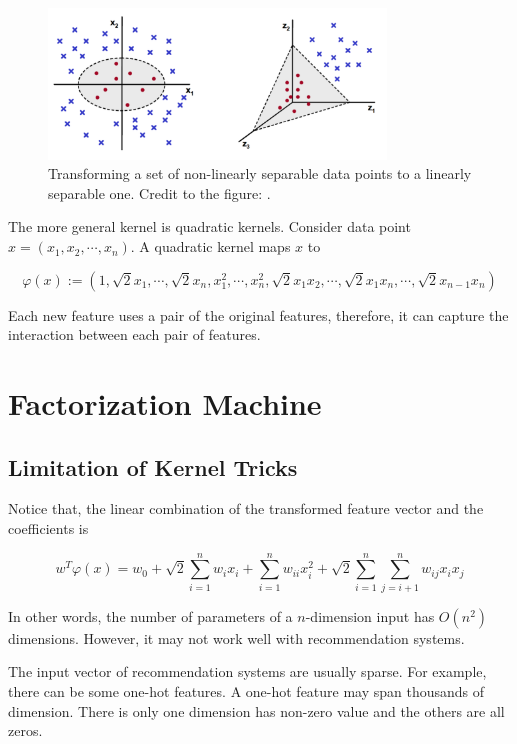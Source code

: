         \begin{figure}[!htp]
            \centering
            \includegraphics[width=0.8\textwidth]{img/kernel-tricks.png}
            \caption{Transforming a set of non-linearly separable data points to a linearly separable one.
                Credit to the figure: \textcite{Rai2011}.}
            \label{fig:kernel-tricks}
        \end{figure}

        The more general kernel is quadratic kernels.
        Consider data point $x = (x_1, x_2, \cdots, x_n)$.
        A quadratic kernel maps $x$ to 

        \[
        \varphi(x) := (1, \sqrt{2}x_1, \cdots, \sqrt{2}x_n, x_1^2, \cdots, x_n^2,
          \sqrt{2}x_1x_2, \cdots, \sqrt{2}x_1x_n, \cdots, \sqrt{2}x_{n-1}x_n)
        \]

        Each new feature uses a pair of the original features,
        therefore, it can capture the interaction between each pair of features.

\section{Factorization Machine}

    \subsection{Limitation of Kernel Tricks}

        Notice that, the linear combination of the transformed feature vector and the coefficients is

        \[
        w^T\varphi(x) = w_0 + \sqrt{2}\sum_{i=1}^n w_ix_i
        + \sum_{i=1}^n w_{ii}x_i^2 + \sqrt{2}\sum_{i=1}^n\sum_{j=i+1}^n w_{ij}x_ix_j
        \]

        In other words, the number of parameters of a $n$-dimension input has $O(n^2)$ dimensions.
        However, it may not work well with recommendation systems.

        The input vector of recommendation systems are usually sparse.
        For example, there can be some one-hot features.
        A one-hot feature may span thousands of dimension.
        There is only one dimension has non-zero value and the others are all zeros.

